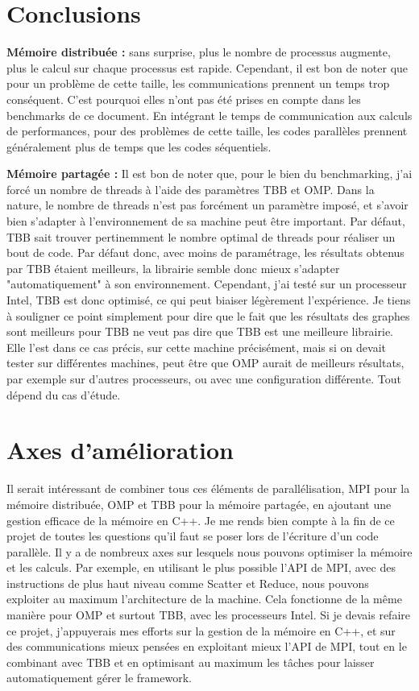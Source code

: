 \documentclass[10pt,twocolumn,letterpaper]{article}
\begin{document}
\section*{Conclusions}
\textbf{Mémoire distribuée : }sans surprise, plus le nombre de processus augmente, plus le calcul sur chaque processus est rapide.
Cependant, il est bon de noter que pour un problème de cette taille, les communications prennent un temps trop conséquent.
C'est pourquoi elles n'ont pas été prises en compte dans les benchmarks de ce document. 
En intégrant le temps de communication aux calculs de performances, pour des problèmes de cette taille, les 
codes parallèles prennent généralement plus de temps que les codes séquentiels.

\textbf{Mémoire partagée : }Il est bon de noter que, pour le bien du benchmarking, j'ai forcé un nombre de threads à l'aide des paramètres TBB et OMP.
Dans la nature, le nombre de threads n'est pas forcément un paramètre imposé, et s'avoir bien s'adapter à l'environnement de sa machine peut être important.
Par défaut, TBB sait trouver pertinemment le nombre optimal de threads pour réaliser un bout de code.
Par défaut donc, avec moins de paramétrage, les résultats obtenus par TBB étaient meilleurs, la librairie semble donc mieux s'adapter "automatiquement" à son environnement.
Cependant, j'ai testé sur un processeur Intel, TBB est donc optimisé, ce qui peut biaiser légèrement l'expérience.
Je tiens à souligner ce point simplement pour dire que le fait que les résultats des graphes sont meilleurs pour TBB ne veut pas dire que TBB est une meilleure librairie.
Elle l'est dans ce cas précis, sur cette machine précisément, mais si on devait tester sur différentes machines, 
peut être que OMP aurait de meilleurs résultats, par exemple sur d'autres processeurs, ou avec une configuration différente. 
Tout dépend du cas d'étude.

\section*{Axes d'amélioration}
Il serait intéressant de combiner tous ces éléments de parallélisation, 
MPI pour la mémoire distribuée, OMP et TBB pour la mémoire partagée, en ajoutant une gestion efficace de la mémoire
en C++. Je me rends bien compte à la fin de ce projet de toutes les questions qu'il faut se poser lors de l'écriture d'un code parallèle.
Il y a de nombreux axes sur lesquels nous pouvons optimiser la mémoire et les calculs. Par exemple, en utilisant le plus possible l'API de MPI,
avec des instructions de plus haut niveau comme Scatter et Reduce, nous pouvons exploiter au maximum l'architecture de la machine.
Cela fonctionne de la même manière pour OMP et surtout TBB, avec les processeurs Intel.
Si je devais refaire ce projet, j'appuyerais mes efforts sur la gestion de la mémoire en C++, et sur des communications mieux pensées en exploitant mieux l'API de MPI, 
tout en le combinant avec TBB et en optimisant au maximum les tâches pour laisser automatiquement gérer le framework.


\end{document}
